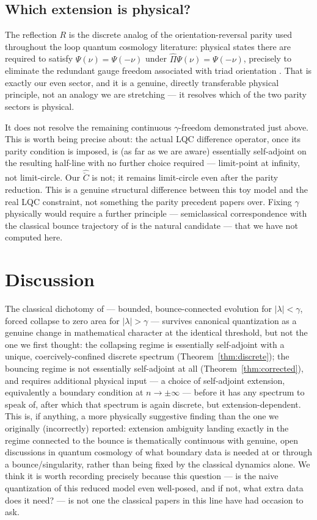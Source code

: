 \documentclass[11pt]{amsart}
\theoremstyle{remark}
\begin{document}
\subsection{Which extension is physical?}
The reflection $R$ is the discrete analog of the orientation-reversal parity used throughout the loop quantum cosmology literature: physical states there are required to satisfy $\Psi(\nu)=\Psi(-\nu)$ under $\hat\Pi\Psi(\nu)=\Psi(-\nu)$, precisely to eliminate the redundant gauge freedom associated with triad orientation \cite{APS1,AgulloSingh}. That is exactly our even sector, and it is a genuine, directly transferable physical principle, not an analogy we are stretching --- it resolves which of the two parity sectors is physical.

It does not resolve the remaining continuous $\gamma$-freedom demonstrated just above. This is worth being precise about: the actual LQC difference operator, once its parity condition is imposed, is (as far as we are aware) essentially self-adjoint on the resulting half-line with no further choice required --- limit-point at infinity, not limit-circle. Our $\hat{\check C}$ is not; it remains limit-circle even after the parity reduction. This is a genuine structural difference between this toy model and the real LQC constraint, not something the parity precedent papers over. Fixing $\gamma$ physically would require a further principle --- semiclassical correspondence with the classical bounce trajectory of \cite{CendalGarayGaray} is the natural candidate --- that we have not computed here.

\section{Discussion}

The classical dichotomy of \cite{CendalGarayGaray} --- bounded, bounce-connected evolution for $|\lambda|<\gamma$, forced collapse to zero area for $|\lambda|>\gamma$ --- survives canonical quantization as a genuine change in mathematical character at the identical threshold, but not the one we first thought: the collapsing regime is essentially self-adjoint with a unique, coercively-confined discrete spectrum (Theorem~\ref{thm:discrete}); the bouncing regime is not essentially self-adjoint at all (Theorem~\ref{thm:corrected}), and requires additional physical input --- a choice of self-adjoint extension, equivalently a boundary condition at $n\to\pm\infty$ --- before it has any spectrum to speak of, after which that spectrum is again discrete, but extension-dependent. This is, if anything, a more physically suggestive finding than the one we originally (incorrectly) reported: extension ambiguity landing exactly in the regime connected to the bounce is thematically continuous with genuine, open discussions in quantum cosmology of what boundary data is needed at or through a bounce/singularity, rather than being fixed by the classical dynamics alone. We think it is worth recording precisely because this question --- is the naive quantization of this reduced model even well-posed, and if not, what extra data does it need? --- is not one the classical papers in this line \cite{CendalGarayGaray,AranguerenGarayLivine} have had occasion to ask.
\end{document}
